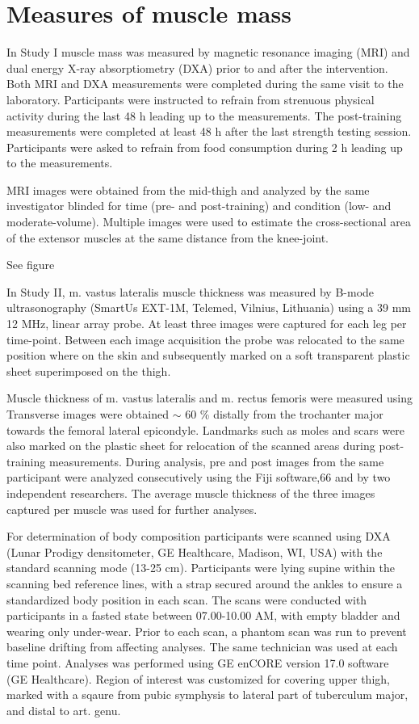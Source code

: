 \documentclass[twoside,10pt]{gihclass} %
\begin{document}
\hypertarget{measures-of-muscle-mass}{%
\section{Measures of muscle mass}\label{measures-of-muscle-mass}}

In Study I muscle mass was measured by magnetic resonance imaging (MRI)
and dual energy X-ray absorptiometry (DXA) prior to and after the
intervention. Both MRI and DXA measurements were completed during the
same visit to the laboratory. Participants were instructed to refrain
from strenuous physical activity during the last 48 h leading up to the
measurements. The post-training measurements were completed at least 48
h after the last strength testing session. Participants were asked to
refrain from food consumption during 2 h leading up to the measurements.

MRI images were obtained from the mid-thigh and analyzed by the same
investigator blinded for time (pre- and post-training) and condition
(low- and moderate-volume). Multiple images were used to estimate the
cross-sectional area of the extensor muscles at the same distance from
the knee-joint.

See figure

In Study II, m. vastus lateralis muscle thickness was measured by B-mode ultrasonography (SmartUs EXT-1M, Telemed, Vilnius, Lithuania) using a 39 mm 12 MHz, linear array probe. At least three images were captured for each leg per time-point. Between each image acquisition the probe was relocated to the same position where on the skin and subsequently marked on a soft transparent plastic sheet superimposed on the thigh.

Muscle thickness of m. vastus lateralis and m. rectus femoris were measured using Transverse images were obtained \(\sim\) 60 \% distally from the trochanter major towards the femoral lateral epicondyle. Landmarks such as moles and scars were also marked on the plastic sheet for relocation of the scanned areas during post-training measurements. During analysis, pre and post images from the same participant were analyzed consecutively using the Fiji software,66 and by two independent researchers. The average muscle thickness of the three images captured per muscle was used for further analyses.

For determination of body composition participants were scanned using DXA (Lunar Prodigy densitometer, GE Healthcare, Madison, WI, USA) with the standard scanning mode (13-25 cm). Participants were lying supine within the scanning bed reference lines, with a strap secured around the ankles to ensure a standardized body position in each scan. The scans were conducted with participants in a fasted state between 07.00-10.00 AM, with empty bladder and wearing only under-wear. Prior to each scan, a phantom scan was run to prevent baseline drifting from affecting analyses. The same technician was used at each time point. Analyses was performed using GE enCORE version 17.0 software (GE Healthcare). Region of interest was customized for covering upper thigh, marked with a sqaure from pubic symphysis to lateral part of tuberculum major, and distal to art. genu.
\end{document}
